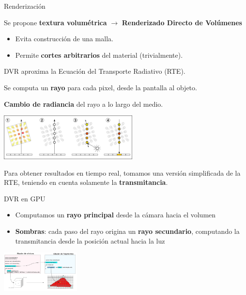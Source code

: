 \documentclass[spanish,unknownkeysallowed,10pt]{beamer}
\begin{document}
\begin{frame}{Renderización}

Se propone \textbf{textura volumétrica} $\rightarrow$ \textbf{Renderizado Directo de Volúmenes}

\begin{itemize}
\item Evita construcción de una malla.
\item Permite \textbf{cortes arbitrarios} del material (trivialmente).
\end{itemize}


DVR aproxima la Ecuación del Transporte Radiativo (RTE).

Se computa un \textbf{rayo} para cada pixel, desde la pantalla al objeto.

\textbf{Cambio de radiancia} del rayo a lo largo del medio.


\centerline{\includegraphics[width=7cm]{../figures/dvr}}

Para obtener resultados en tiempo real, tomamos una versión simplificada de la RTE, teniendo en cuenta solamente la \textbf{transmitancia}.
\end{frame}
\begin{frame}{DVR en GPU}

\begin{itemize}
\item Computamos un \textbf{rayo principal} desde la cámara hacia el volumen
\item \textbf{Sombras}: cada paso del rayo origina un \textbf{rayo secundario}, computando la transmitancia desde la posición actual hacia la luz
\end{itemize}

\centerline{\includegraphics[width=4cm]{../figures/fragmentshader}}

\end{frame}
\end{document}
